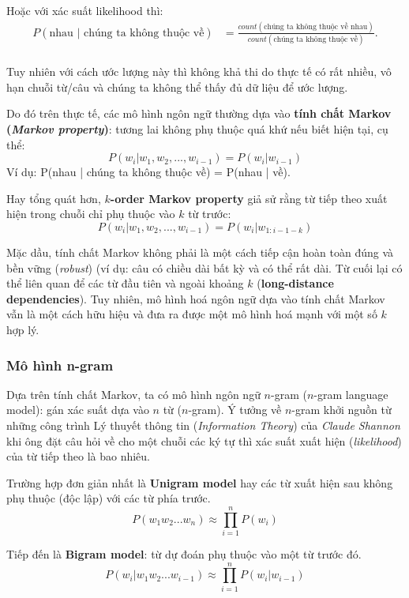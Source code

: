 Hoặc với xác suất likelihood thì:
\begin{equation}
\begin{split}
P(\text{nhau | chúng ta không thuộc về})&=\frac{count(\text{chúng ta không thuộc về nhau})}{count(\text{chúng ta không thuộc về})}.\\
\end{split}
\end{equation}

Tuy nhiên với cách ước lượng này thì không khả thi do thực tế có rất nhiều, vô hạn chuỗi từ/câu  và chúng ta không thể thấy đủ dữ liệu để ước lượng. 

Do đó trên thực tế, các mô hình ngôn ngữ thường dựa vào \textbf{tính chất Markov (\textit{Markov property})}: tương lai không phụ thuộc quá khứ nếu biết hiện tại, cụ thể: 
$$P(w_i|w_1,w_2,...,w_{i-1})=P(w_i|w_{i-1})$$
Ví dụ: P(nhau | chúng ta không thuộc về) = P(nhau | về).

Hay tổng quát hơn, \textbf{$k$-order Markov property} giả sử rằng từ tiếp theo xuất hiện trong chuỗi chỉ phụ thuộc vào $k$ từ trước:
$$P(w_i|w_1,w_2,...,w_{i-1})=P(w_i|w_{1:i-1-k})$$

Mặc dầu, tính chất Markov không phải là một cách tiếp cận hoàn toàn đúng và bền vững (\textit{robust}) (ví dụ: câu có chiều dài bất kỳ và có thể rất dài. Từ cuối lại có thể liên quan để các từ đầu tiên và ngoài khoảng $k$ (\textbf{long-distance dependencies}). Tuy nhiên, mô hình hoá ngôn ngữ dựa vào tính chất Markov vẫn là một cách hữu hiệu và đưa ra được một mô hình hoá mạnh với một số $k$ hợp lý.

\subsubsection{Mô hình n-gram}
Dựa trên tính chất Markov, ta có mô hình ngôn ngữ $n$-gram ($n$-gram language model): gán xác suất dựa vào $n$ từ ($n$-gram). Ý tưởng về $n$-gram khởi nguồn từ những công trình Lý thuyết thông tin (\textit{Information Theory}) của \textit{Claude Shannon} khi ông đặt câu hỏi về cho một chuỗi các ký tự thì xác suất xuất hiện (\textit{likelihood}) của từ tiếp theo là bao nhiêu.


Trường hợp đơn giản nhất là \textbf{Unigram model} hay các từ xuất hiện sau không phụ thuộc (độc lập) với các từ phía trước.
$$P(w_1w_2...w_n)\approx\prod_{i=1}^{n} P(w_i)$$

Tiếp đến là \textbf{Bigram model}: từ dự đoán phụ thuộc vào một từ trước đó.
$$P(w_i|w_1w_2...w_{i-1})\approx\prod_{i=1}^{n} P(w_i|w_{i-1})$$


